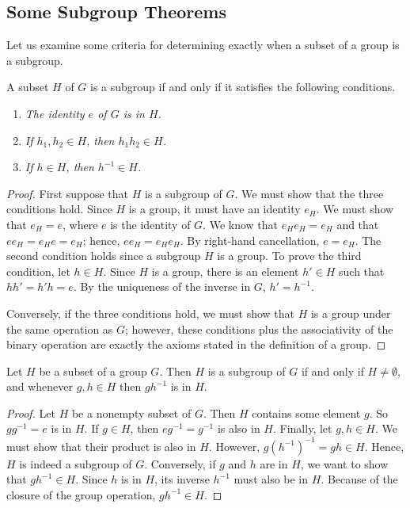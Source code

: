  
\subsection*{Some Subgroup Theorems}
 
 
Let us examine some criteria for determining exactly when a subset of
a group is a subgroup.
 
 
\begin{proposition}
A subset $H$ of $G$ is a subgroup if and only if it satisfies the
following conditions. 
\begin{enumerate}
 
\rm \item \it 
The identity $e$ of $G$ is in $H$. 
 
\rm \item \it 
If $h_1, h_2 \in H$, then $h_1h_2 \in H$. 
 
\rm \item \it 
If $h \in H$, then $h^{-1} \in H$.
 
\end{enumerate}
\end{proposition}
 
 
\begin{proof}
First suppose that $H$ is a subgroup of $G$.  We must show that the three conditions hold.  Since $H$ is a group, it must have an identity $e_H$.  We must show that $e_H = e$, where $e$ is the identity of $G$. We know that $e_H e_H = e_H$ and that $ee_H = e_H e = e_H$; hence, $ee_H = e_H e_H$.  By right-hand cancellation, $e =e_H$.  The second condition holds since a subgroup $H$ is a group.  To prove the third condition, let $h \in H$.  Since $H$ is a group, there is  an element $h' \in H$ such that $hh' = h'h = e$.  By the uniqueness  of the inverse in $G$, $h' = h^{-1}$.

Conversely, if the three conditions hold, we must show that $H$ is a group under the same operation as $G$; however, these conditions plus the associativity of the binary operation are exactly the axioms stated in the definition of a group.
\end{proof}

\begin{proposition}\label{groups:subgroup_prop}
Let $H$ be a subset of a group $G$.  Then $H$ is a subgroup of $G$ if and only if $H \neq \emptyset$, and whenever $g, h \in H$ then $gh^{-1}$ is in $H$. 
\end{proposition}
 
 
\begin{proof}
Let $H$ be a nonempty subset of $G$.  Then $H$ contains some element $g$.  So $gg^{-1} = e$ is in $H$.  If $g \in H$, then $eg^{-1} = g^{-1}$ is also in $H$. Finally, let $g, h \in H$. We must show that their product is also in $H$.  However, $g(h^{-1})^{-1} = gh \in H$.  Hence, $H$ is indeed a subgroup of $G$. Conversely, if $g$ and $h$ are in $H$, we want to show that $gh^{-1} \in H$.  Since $h$ is in $H$, its inverse $h^{-1}$ must also be in $H$.  Because of the closure of the group operation, $gh^{-1} \in H$. 
\end{proof}
 
